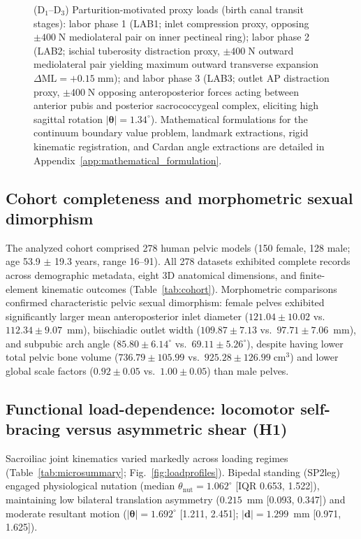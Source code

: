 \begin{figure}[tp]
{(D$_1$--D$_3$) Parturition-motivated proxy loads (birth canal transit stages): labor phase 1 (LAB1; inlet compression proxy, opposing $\pm 400\;\text{N}$ mediolateral pair on inner pectineal ring); labor phase 2 (LAB2; ischial tuberosity distraction proxy, $\pm 400\;\text{N}$ outward mediolateral pair yielding maximum outward transverse expansion $\Delta\text{ML} = +0.15\;\text{mm}$); and labor phase 3 (LAB3; outlet AP distraction proxy, $\pm 400\;\text{N}$ opposing anteroposterior forces acting between anterior pubis and posterior sacrococcygeal complex, eliciting high sagittal rotation $|\boldsymbol{\theta}| = 1.34^\circ$). Mathematical formulations for the continuum boundary value problem, landmark extractions, rigid kinematic registration, and Cardan angle extractions are detailed in Appendix~\ref{app:mathematical_formulation}.}
\label{fig:overview}
\end{figure}

\subsection{Cohort completeness and morphometric sexual dimorphism}
The analyzed cohort comprised 278 human pelvic models (150 female, 128 male; age 53.9 $\pm$ 19.3 years, range 16--91). All 278 datasets exhibited complete records across demographic metadata, eight 3D anatomical dimensions, and finite-element kinematic outcomes (Table~\ref{tab:cohort}). Morphometric comparisons confirmed characteristic pelvic sexual dimorphism: female pelves exhibited significantly larger mean anteroposterior inlet diameter ($121.04 \pm 10.02$ vs.\ $112.34 \pm 9.07$~mm), biischiadic outlet width ($109.87 \pm 7.13$ vs.\ $97.71 \pm 7.06$~mm), and subpubic arch angle ($85.80 \pm 6.14^\circ$ vs.\ $69.11 \pm 5.26^\circ$), despite having lower total pelvic bone volume ($736.79 \pm 105.99$ vs.\ $925.28 \pm 126.99\;\text{cm}^3$) and lower global scale factors ($0.92 \pm 0.05$ vs.\ $1.00 \pm 0.05$) than male pelves.

\subsection{Functional load-dependence: locomotor self-bracing versus asymmetric shear (H1)}
Sacroiliac joint kinematics varied markedly across loading regimes (Table~\ref{tab:microsummary}; Fig.~\ref{fig:loadprofiles}). Bipedal standing (SP2leg) engaged physiological nutation (median $\theta_{\text{nut}} = 1.062^\circ$ [IQR 0.653, 1.522]), maintaining low bilateral translation asymmetry ($0.215$~mm [0.093, 0.347]) and moderate resultant motion ($|\boldsymbol{\theta}| = 1.692^\circ$ [1.211, 2.451]; $|\mathbf{d}| = 1.299$~mm [0.971, 1.625]).


